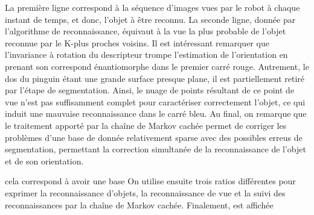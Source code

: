 \begin{figure}[H]
			\caption{}
	\label{fig:resultats_expe}
\end{figure}

La première ligne correspond à la séquence d'images vues par le robot à chaque instant de temps, et donc, l'objet à être reconnu. La seconde ligne, donnée par l'algorithme de reconnaissance, équivaut à la vue la plus probable de l'objet reconnue par le K-plus proches voisins. Il est intéressant remarquer que l'invariance à rotation du descripteur trompe l'estimation de l'orientation en prenant son correspond énantiomorphe dans le premier carré rouge. Autrement, le dos du pinguin étant une grande surface presque plane, il est partiellement retiré par l'étape de segmentation. Ainsi, le nuage de points résultant de ce point de vue n'est pas suffisamment complet pour caractériser correctement l'objet, ce qui induit une mauvaise reconnaissance dans le carré bleu. Au final, on remarque que le traitement apporté par la chaîne de Markov cachée permet de corriger les problèmes d'une base de donnée relativement sparse avec des possibles erreus de segmentation, permettant la correction simultanée de la reconnaissance de l'objet et de son orientation. 

cela correspond à avoir une base
On utilise ensuite trois ratios différentes pour exprimer la reconnaissance d'objets, la reconnaissance de vue et la suivi des reconnaissances par la chaîne de Markov cachée.
Finalement,  est affichée

